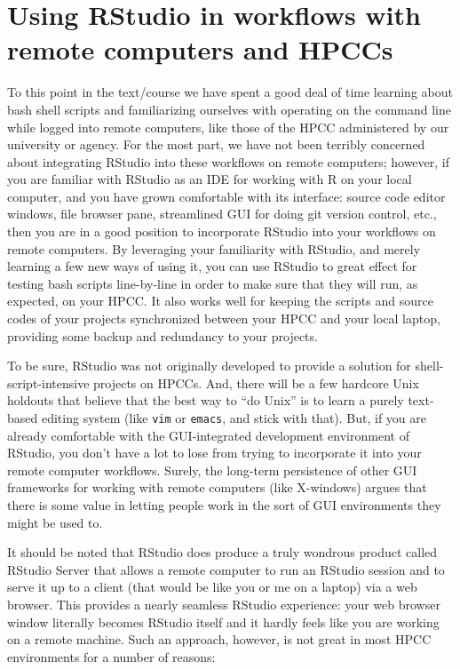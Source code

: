 \documentclass[]{krantz}
\begin{document}
\hypertarget{using-rstudio-in-workflows-with-remote-computers-and-hpccs}{%
\section{Using RStudio in workflows with remote computers and HPCCs}\label{using-rstudio-in-workflows-with-remote-computers-and-hpccs}}

To this point in the text/course we have spent a good deal of time
learning about bash shell scripts and familiarizing ourselves with
operating on the command line while logged into remote computers, like those
of the HPCC administered by our university or agency. For the most part,
we have not been terribly concerned about integrating RStudio into these
workflows on remote computers; however, if you are familiar with RStudio
as an IDE for working with R on your local computer, and you have grown
comfortable with its interface: source code editor windows, file browser pane,
streamlined GUI for doing git version control, etc., then you are in a good
position to incorporate RStudio into your workflows on remote computers.
By leveraging your familiarity with RStudio, and merely learning a few new
ways of using it, you can use RStudio to great effect for testing bash
scripts line-by-line in order to make sure that they will run, as expected,
on your HPCC. It also works well for keeping the scripts and source codes
of your projects synchronized between your HPCC and your local laptop, providing
some backup and redundancy to your projects.

To be sure, RStudio was not originally developed to provide a solution for
shell-script-intensive projects on HPCCs. And, there will be a few hardcore
Unix holdouts that believe that the best way to ``do Unix'' is to learn a
purely text-based editing system (like \texttt{vim} or \texttt{emacs}, and stick with that).
But, if you are already comfortable with the GUI-integrated development environment of
RStudio, you don't have a lot to lose from trying to incorporate it into your
remote computer workflows. Surely, the long-term persistence of other GUI
frameworks for working with remote computers (like X-windows) argues that there
is some value in letting people work in the sort of GUI environments they might
be used to.

It should be noted that RStudio does produce a truly wondrous product
called RStudio Server that allows a remote computer to run an RStudio
session and to serve it up to a client (that would be like you or me on a laptop)
via a web browser. This provides a nearly seamless RStudio experience: your
web browser window literally becomes RStudio itself and it hardly feels like
you are working on a remote machine. Such an approach, however, is not
great in most HPCC environments for a number of reasons:
\end{document}
